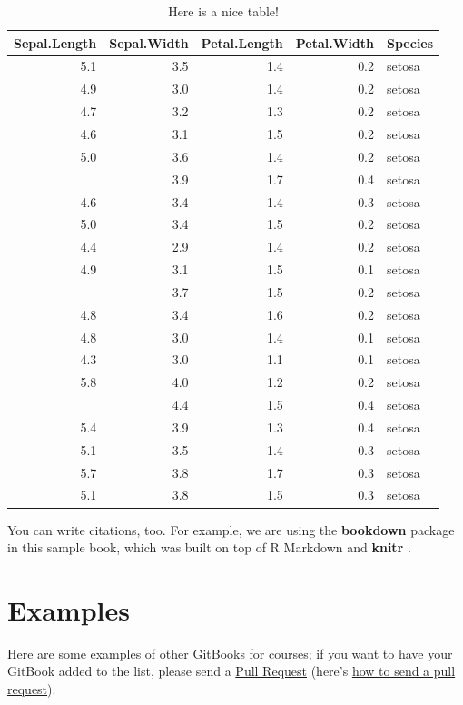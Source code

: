\documentclass[
]{book}
\begin{document}
\begin{table}

\caption{\label{tab:nice-tab}Here is a nice table!}
\centering
\begin{tabular}[t]{rrrrl}
\toprule
Sepal.Length & Sepal.Width & Petal.Length & Petal.Width & Species\\
\midrule
5.1 & 3.5 & 1.4 & 0.2 & setosa\\
4.9 & 3.0 & 1.4 & 0.2 & setosa\\
4.7 & 3.2 & 1.3 & 0.2 & setosa\\
4.6 & 3.1 & 1.5 & 0.2 & setosa\\
5.0 & 3.6 & 1.4 & 0.2 & setosa\\
\addlinespace
5.4 & 3.9 & 1.7 & 0.4 & setosa\\
4.6 & 3.4 & 1.4 & 0.3 & setosa\\
5.0 & 3.4 & 1.5 & 0.2 & setosa\\
4.4 & 2.9 & 1.4 & 0.2 & setosa\\
4.9 & 3.1 & 1.5 & 0.1 & setosa\\
\addlinespace
5.4 & 3.7 & 1.5 & 0.2 & setosa\\
4.8 & 3.4 & 1.6 & 0.2 & setosa\\
4.8 & 3.0 & 1.4 & 0.1 & setosa\\
4.3 & 3.0 & 1.1 & 0.1 & setosa\\
5.8 & 4.0 & 1.2 & 0.2 & setosa\\
\addlinespace
5.7 & 4.4 & 1.5 & 0.4 & setosa\\
5.4 & 3.9 & 1.3 & 0.4 & setosa\\
5.1 & 3.5 & 1.4 & 0.3 & setosa\\
5.7 & 3.8 & 1.7 & 0.3 & setosa\\
5.1 & 3.8 & 1.5 & 0.3 & setosa\\
\bottomrule
\end{tabular}
\end{table}

You can write citations, too. For example, we are using the \textbf{bookdown} package \citep{R-bookdown} in this sample book, which was built on top of R Markdown and \textbf{knitr} \citep{xie2015}.

\chapter{Examples}\label{examples}

Here are some examples of other GitBooks for courses; if you want to have your GitBook added to the list, please send a \href{https://github.com/cjvanlissa/gitbook-demo/pulls}{Pull Request} (here's \href{https://help.github.com/en/github/collaborating-with-issues-and-pull-requests/creating-a-pull-request}{how to send a pull request}).
\end{document}
